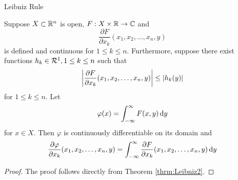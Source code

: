 \begin{section}{Leibniz Rule}

\begin{thrm}
	Suppose $X \subset \mathbb{R}^n$ is open, $F:X
	\times \mathbb{R} \to \mathbb{C}$ and
		\begin{displaymath}
			\frac{\partial F}{\partial x_k}
				(x_1, x_2, \ldots, x_n, y)
		\end{displaymath}
	is defined and continuous for $1 \leq k \leq n$.
	Furthermore, suppose there exist functions $h_k
	\in \mathcal{R}^1, 1 \leq k \leq n$ such that
		\begin{displaymath}
			\left \vert {
				\frac{\partial F}{\partial x_k}
				(x_1, x_2, \ldots, x_n, y)} \right \vert
			\leq \left \vert {h_k(y)} \right \vert
		\end{displaymath}
	for $1 \leq k \leq n$.
	Let
		\begin{displaymath}
			\varphi(x) = \int_{-\infty}^{\infty}{F(x,y)}\, \mathrm{d}{y}
		\end{displaymath}
	for $x \in X$.
	Then $\varphi$ is continuously differentiable
	on its domain and
		\begin{displaymath}
			\frac{\partial \varphi}{\partial x_k}
				(x_1, x_2, \ldots, x_n, y)
				= \int_{-\infty}^{\infty}{\frac{\partial F}
				{\partial x_k}(x_1, x_2, \ldots, x_n, y)}\, \mathrm{d}{y}
		\end{displaymath}
\end{thrm}

\begin{proof}
	The proof follows directly from Theorem \ref{thrm:Leibniz2}.
\end{proof}

\end{section}
